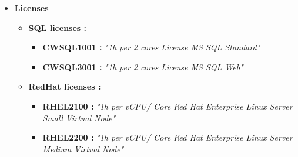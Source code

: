 \begin{itemize}
    \item \textbf{Licenses} \begin{itemize}
              \item \textbf{SQL licenses :} \begin{itemize}
                        \item \textbf{CWSQL1001 : } \textit{"1h per 2 cores License MS SQL Standard"}
                        \item \textbf{CWSQL3001 : } \textit{"1h per 2 cores License MS SQL Web"}
                    \end{itemize}
              \item \textbf{RedHat licenses :} \begin{itemize}
                        \item \textbf{RHEL2100 : } \textit{"1h per vCPU/ Core Red Hat Enterprise Linux Server Small Virtual Node"}
                        \item \textbf{RHEL2200 : } \textit{"1h per vCPU/ Core Red Hat Enterprise Linux Server Medium Virtual Node"}
                    \end{itemize}
          \end{itemize}


\end{itemize}

